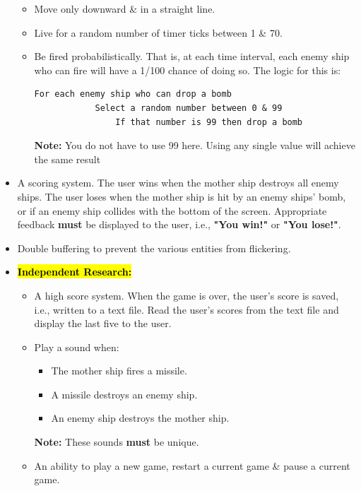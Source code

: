 \documentclass{article}
\begin{document}
\begin{itemize}
\begin{itemize}
        \item Move only downward \& in a straight line.
        \item Live for a random number of timer ticks between 1 \& 70.
        \item Be fired probabilistically. That is, at each time interval, each enemy ship who can fire will have a 1/100 chance of doing so. The logic for this is:
        \begin{Verbatim}[tabsize=2]
        For each enemy ship who can drop a bomb
            Select a random number between 0 & 99
                If that number is 99 then drop a bomb   
        \end{Verbatim}
        \textbf{Note:} You do not have to use 99 here. Using any single value will achieve the same result
    \end{itemize}
    \item A scoring system. The user wins when the mother ship destroys all enemy ships. The user loses when the mother ship is hit by an enemy ships' bomb, or if an enemy ship collides with the bottom of the screen. Appropriate feedback \textbf{must} be displayed to the user, i.e., \textbf{"You win!"} or \textbf{"You lose!"}.
    \item Double buffering to prevent the various entities from flickering.
    \item \hl{\textbf{Independent Research:}}
    \begin{itemize}
        \item A high score system. When the game is over, the user's score is saved, i.e., written to a text file. Read the user's scores from the text file and display the last five to the user.
        \item Play a sound when:
        \begin{itemize}
            \item The mother ship fires a missile.
            \item A missile destroys an enemy ship.
            \item An enemy ship destroys the mother ship.
        \end{itemize}
        \textbf{Note:} These sounds \textbf{must} be unique.
        \item An ability to play a new game, restart a current game \& pause a current game.
    \end{itemize}
\end{itemize}
\end{document}
